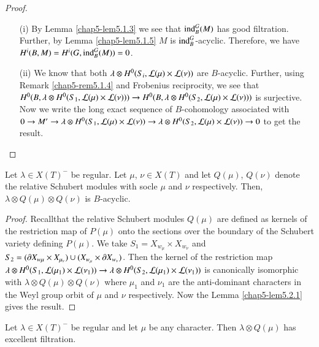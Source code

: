 \begin{proof}
\begin{itemize}
\item[(i)] By Lemma \ref{chap5-lem5.1.3} we see that $\operatorname{ind}^{G}_{B}(M)$
  has good filtration. Further, by Lemma \ref{chap5-lem5.1.5} $M$ is
  $\operatorname{ind}^{G}_{B}$-acyclic. Therefore, we have
  $H^{i}(B,M)=H^{i}(G,\operatorname{ind}^{G}_{B}(M))=0$.

\item[(ii)] We know that both $\lambda\otimes
  H^{0}(S_{i},\mathcal{L}(\mu)\times \mathcal{L}(\nu))$ are $B$-acyclic. Further, using
  Remark \ref{chap5-rem5.1.4} and Frobenius reciprocity, we see that
  $H^{0}(B,\lambda\otimes H^{0}(S_{1},\mathcal{L}(\mu)\times\mathcal{L}(\nu)))\to
  H^{0}(B,\lambda\otimes H^{0}(S_{2},\mathcal{L}(\mu)\times \mathcal{L}(\nu)))$ is
  surjective. Now we write the long exact sequence of $B$-cohomo\-logy
  associated with $0\to M'\to \lambda\otimes
  H^{0}(S_{1},\mathcal{L}(\mu)\times\mathcal{L}(\nu))\to \lambda\otimes
  H^{0}(S_{2},\mathcal{L}(\mu)\times \mathcal{L}(\nu))\to 0$ to get the result.
\end{itemize}
\end{proof}

\begin{corollary}\label{chap5-coro5.2.2}
Let $\lambda\in X(T)^{-}$ be regular. Let $\mu$, $\nu\in X(T)$ and let
$Q(\mu)$, $Q(\nu)$ denote the relative Schubert modules with socle
$\mu$ and $\nu$ respectively. Then, $\lambda\otimes Q(\mu)\otimes
Q(\nu)$ is $B$-acyclic.
\end{corollary}

\begin{proof}
Recall\pageoriginale that\label{page52} the relative Schubert modules $Q(\mu)$ are
defined as kernels of the restriction map of $P(\mu)$ onto the
sections over the boundary of the Schubert variety defining
$P(\mu)$. We take $S_{1}=X_{w_{\mu}}\times X_{w_{\nu}}$ and $S_{2}=(\partial
X_{w{\mu}}\times X_{\mu_{\nu}})\cup (X_{w_{\mu}}\times \partial
X_{w_{\nu}})$. Then the kernel of the restriction map $\lambda\otimes
H^{0}(S_{1},\mathcal{L}(\mu_{1})\times \mathcal{L}(\nu_{1}))\to \lambda\otimes
H^{0}(S_{2},\mathcal{L}(\mu_{1})\times \mathcal{L}(\nu_{1}))$ is canonically isomorphic
with $\lambda\otimes Q(\mu)\otimes Q(\nu)$ where $\mu_{1}$ and
$\nu_{1}$ are the anti-dominant characters in the Weyl group orbit of
$\mu$ and $\nu$ respectively. Now the Lemma \ref{chap5-lem5.2.1} gives
the result.
\end{proof}

\begin{corollary}\label{chap5-coro5.2.3}
Let $\lambda\in X(T)^{-}$ be regular and let $\mu$ be any
character. Then $\lambda\otimes Q(\mu)$ has excellent filtration.
\end{corollary}


